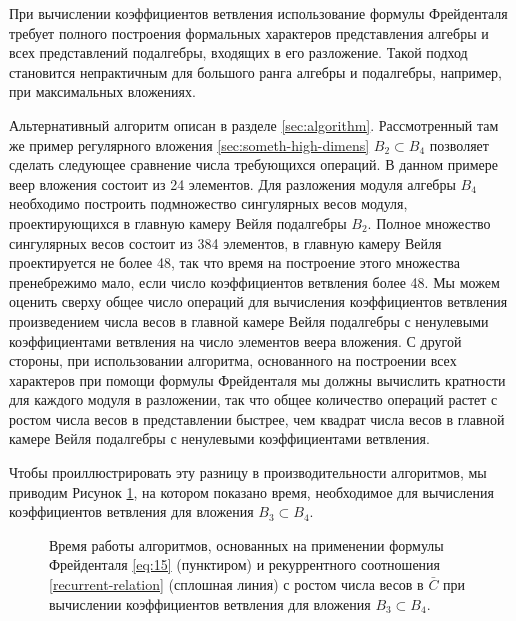 При вычислении коэффициентов ветвления использование формулы Фрейденталя требует полного построения формальных характеров представления алгебры и всех представлений подалгебры, входящих в его разложение. Такой подход становится непрактичным для большого ранга алгебры и подалгебры, например, при максимальных вложениях. 

Альтернативный алгоритм описан в разделе \ref{sec:algorithm}. Рассмотренный там же пример регулярного вложения \ref{sec:someth-high-dimens}  $B_{2}\subset B_{4}$ позволяет сделать следующее сравнение числа требующихся операций. В данном примере веер вложения состоит из 24 элементов. Для разложения модуля алгебры  $B_{4}$ необходимо построить подмножество сингулярных весов модуля, проектирующихся в главную камеру Вейля подалгебры $B_{2}$. Полное множество сингулярных весов состоит из 384 элементов, в главную камеру Вейля проектируется не более 48, так что время на построение этого множества пренебрежимо мало, если число коэффициентов ветвления более 48. Мы можем оценить сверху общее число операций для вычисления коэффициентов ветвления произведением числа весов в главной камере Вейля подалгебры с ненулевыми коэффициентами ветвления на число элементов веера вложения. 
С другой стороны, при использовании алгоритма, основанного на построении всех характеров при помощи формулы Фрейденталя мы должны вычислить кратности для каждого модуля в разложении, так что общее количество операций растет с ростом числа весов в представлении быстрее, чем квадрат числа весов в главной камере Вейля подалгебры с ненулевыми коэффициентами ветвления. 

Чтобы проиллюстрировать эту разницу в производительности алгоритмов, мы приводим Рисунок \ref{fig:branching}, на котором показано время, необходимое для вычисления коэффициентов ветвления для вложения $B_{3}\subset B_{4}$.

\begin{figure}[h]
  \noindent{}
  \caption{Время работы алгоритмов, основанных на применении формулы Фрейденталя \eqref{eq:15} (пунктиром)  и рекуррентного соотношения \eqref{recurrent-relation} (сплошная линия) с ростом числа весов в  $\bar C$ при вычислении коэффициентов ветвления для вложения $B_{3}\subset B_{4}$.}
  \label{fig:branching}
\end{figure}

